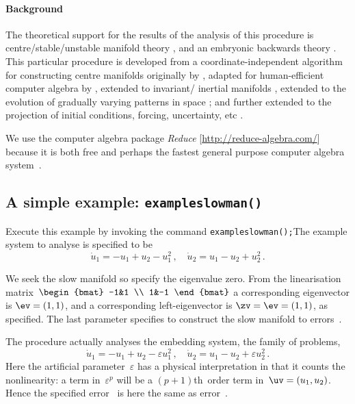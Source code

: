 \documentclass[11pt,a5paper]{article}
\def\eps{\varepsilon}
\begin{document}
\paragraph{Background}
The theoretical support for the results of the analysis of
this procedure is centre\slash stable\slash unstable
manifold theory \cite[e.g.,][]{Carr81, Haragus2011,
Roberts2014a}, and an embryonic backwards theory
\cite[]{Roberts2018a}. This particular procedure is
developed from a coordinate-independent algorithm for
constructing centre manifolds originally by
\cite{Coullet83}, adapted for human-efficient computer
algebra by \cite{Roberts96a}, extended to invariant\slash
inertial manifolds \cite[]{Roberts89, Foias88b}, extended to
the evolution of gradually varying patterns in space
\cite[]{Roberts88a, Roberts2013a, Bunder2018a}; and further 
extended to the projection of initial conditions, forcing, 
uncertainty, etc \cite[]{Roberts89b, Roberts97b}.

We use the computer algebra package \emph{Reduce} 
[\url{http://reduce-algebra.com/}] because it is both free 
and perhaps the fastest general purpose computer algebra 
system~\cite[e.g.]{Fateman2002}.



\subsection{A simple example: \texttt{exampleslowman()}} 
\label{ss:eg}
Execute this example by invoking the command
\verb|exampleslowman();|\quad The example system to analyse
is specified to be \cite[Example~2.1]{Roberts2014a}
\begin{equation*}
\dot u_1=-u_1+u_2-u_1^2\,, \quad \dot u_2=u_1-u_2+u_2^2\,.
\end{equation*}
We seek the slow manifold so specify the eigenvalue zero.
From the linearisation matrix~\(\begin{bmat} -1&1 \\ 1&-1
\end{bmat}\) a corresponding eigenvector is \(\ev=(1,1)\),
and a corresponding left-eigenvector is \(\zv=\ev=(1,1)\),
as specified. The last parameter specifies to construct the
slow manifold to errors~\Ord{\eps^5}.

The procedure actually analyses the embedding system, the
family of problems,
\begin{equation*}
\dot u_1=-u_1+u_2-\eps u_1^2\,, \quad 
\dot u_2=u_1-u_2+\eps u_2^2\,.
\end{equation*}
Here the artificial parameter~\(\eps\) has a physical
interpretation in that it counts the nonlinearity: a term
in~\(\eps^p\) will be a \((p+1)\)th~order term
in~\(\uv=(u_1,u_2)\). Hence the specified error~\Ord{\eps^5}
is here the same as error~.
\end{document}
